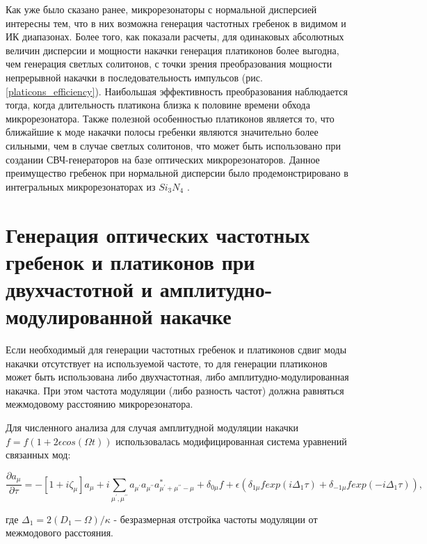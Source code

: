 Как уже было сказано ранее, микрорезонаторы с нормальной дисперсией интересны тем, что в них возможна генерация частотных гребенок в видимом и ИК диапазонах. Более того, как показали расчеты, для одинаковых абсолютных величин дисперсии и мощности накачки генерация платиконов более выгодна, чем генерация светлых солитонов, с точки зрения преобразования мощности непрерывной накачки в последовательность импульсов (рис. \ref{platicons_efficiency}). Наибольшая эффективность преобразования наблюдается тогда, когда длительность платикона близка к половине времени обхода микрорезонатора. Также полезной особенностью платиконов является то, что ближайшие к моде накачки полосы гребенки являются значительно более сильными, чем в случае светлых солитонов, что может быть использовано при создании СВЧ-генераторов на базе оптических микрорезонаторов. Данное преимущество гребенок при нормальной дисперсии было продемонстрировано в интегральных микрорезонаторах из $Si_3N_4$ \cite{Xue2017}.


\section{Генерация оптических частотных гребенок и платиконов при двухчастотной и амплитудно-модулированной накачке}

Если необходимый для генерации частотных гребенок и платиконов сдвиг моды накачки отсутствует на используемой частоте, то для генерации платиконов может быть использована либо двухчастотная, либо амплитудно-модулированная накачка. При этом частота модуляции (либо разность частот) должна равняться межмодовому расстоянию микрорезонатора.

Для численного анализа для случая амплитудной модуляции накачки $f=f(1+2\epsilon cos(\Omega t))$ использовалась модифицированная система уравнений связанных мод:

\begin{equation}
\frac{\partial a_\mu}{\partial \tau}=-[1+i\zeta_{\mu}]a_\mu+i\sum_{\mu^\prime,\mu^{\prime\prime}} a_{\mu^\prime}a_{\mu^{\prime\prime}}a_{\mu^\prime+\mu^{\prime\prime}-\mu}^*+\delta_{0\mu}f+\epsilon(\delta_{1\mu}f exp(i\Delta_1\tau)+\delta_{-1\mu}f exp(-i\Delta_1\tau)),
\end{equation}

где $\Delta_1=2(D_1-\Omega)/\kappa$ - безразмерная отстройка частоты модуляции от межмодового расстояния.

